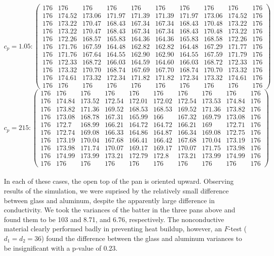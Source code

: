 \documentclass[12pt,draft]{reedmcm}
\begin{document}
\[c_p = 1.05: \begin{pmatrix} 176&176&176&176&176&176&176&176&176&176\\
176&174.52&173.06&171.97&171.39&171.39&171.97&173.06&174.52&176\\
176&173.22&170.47&168.43&167.34&167.34&168.43&170.48&173.22&176\\
176&173.22&170.47&168.43&167.34&167.34&168.43&170.48&173.22&176\\
176&172.26&168.57&165.83&164.36&164.36&165.83&168.58&172.26&176\\
176&171.76&167.59&164.48&162.82&162.82&164.48&167.29&171.77&176\\
176&171.76&167.64&164.55&162.90&162.90&164.55&167.59&171.79&176\\
176&172.33&168.72&166.03&164.59&164.60&166.03&168.72&172.33&176\\
176&173.32&170.70&168.74&167.69&167.70&168.74&170.70&173.32&176\\
176&174.61&173.32&172.34&171.82&171.82&172.34&173.32&174.61&176\\
176&176&176&176&176&176&176&176&176&176\end{pmatrix}\]
\[c_p = 215: \begin{pmatrix} 176&176&176&176&176&176&176&176&176&176\\
176&174.84&173.52&172.54&172.01&172.02&172.54&173.53&174.84&176\\
176&173.82&171.36&169.52&168.53&168.53&169.52&171.36&173.82&176\\
176&173.08&168.78&167.31&165.99&166&167.32&169.79&173.08&176\\
176&172.7&168.99&166.21&164.72&164.72&166.21&169&172.71&176\\
176&172.74&169.08&166.33&164.86&164.87&166.34&169.08&172.75&176\\
176&173.19&170.04&167.68&166.41&166.42&167.68&170.04&173.19&176\\
176&173.98&171.74&170.07&169.17&169.17&170.07&171.75&173.98&176\\
176&174.99&173.99&173.21&172.79&172.8&173.21&173.99&174.99&176\\
176&176&176&176&176&176&176&176&176&176 \end{pmatrix}\]
\\
In each of these cases, the open top of the pan is oriented upward.  Observing results of the simulation, we were suprised by the relatively small difference between glass and aluminum, despite the apparently large difference in conductivity.  We took the variances of the batter in the three pans above and found them to be 103 and 8.71, and 6.76, respectively.  The nonconductive material clearly performed badly in preventing heat buildup, however, an $F$-test ($d_1 = d_2 = 36$) found the difference between the glass and aluminum variances to be insignificant with a p-value of $0.23$.
\end{document}
